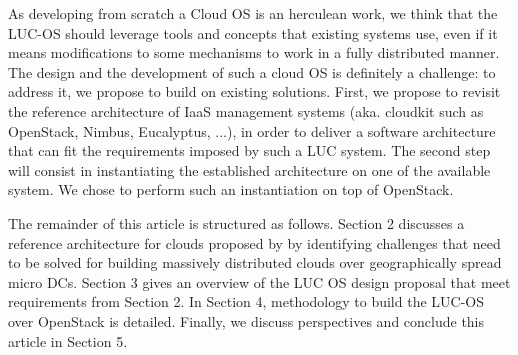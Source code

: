 As developing from scratch a Cloud OS is an herculean work, we think that the 
LUC-OS should leverage tools and concepts that existing systems use, even if 
it means modifications to some mechanisms to work in a fully distributed manner.
The design and the development of such a cloud OS is definitely a challenge: to 
address it, we propose to build on existing solutions. First, we propose 
to revisit the reference architecture of IaaS management systems (aka. cloudkit 
such as OpenStack, Nimbus, Eucalyptus, ...), in order to deliver a software 
architecture that can fit the requirements imposed by such a LUC system. The 
second step will consist in instantiating the established architecture on one of
the available system. We chose to perform such an instantiation on top of 
OpenStack. 

The remainder of this article is structured as follows. Section 2 discusses a 
reference architecture for clouds proposed by \cite{moreno2012iaas} by 
identifying challenges that need to be solved for building massively distributed 
clouds over geographically spread micro DCs. Section 3 gives an overview of the 
LUC OS design proposal that meet requirements from Section 2. In Section 4, 
methodology to build the LUC-OS over OpenStack is detailed. Finally, we 
discuss perspectives and conclude this article in Section 5.